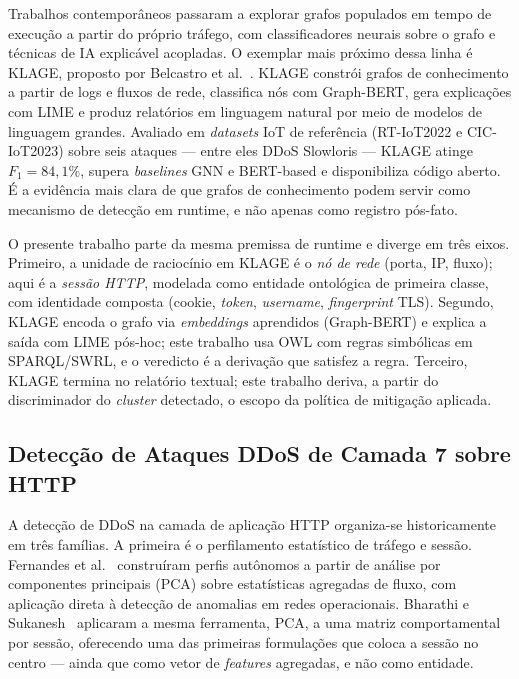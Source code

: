 \documentclass[preprint,12pt]{elsarticle}
\begin{document}
Trabalhos contemporâneos passaram a explorar grafos populados em tempo de execução a partir do próprio tráfego, com classificadores neurais sobre o grafo e técnicas de IA explicável acopladas. O exemplar mais próximo dessa linha é KLAGE, proposto por Belcastro et al.~\cite{belcastro2025klage}. KLAGE constrói grafos de conhecimento a partir de logs e fluxos de rede, classifica nós com Graph-BERT, gera explicações com LIME e produz relatórios em linguagem natural por meio de modelos de linguagem grandes. Avaliado em \emph{datasets} IoT de referência (RT-IoT2022 e CIC-IoT2023) sobre seis ataques --- entre eles DDoS Slowloris --- KLAGE atinge $F_1 = 84{,}1\%$, supera \emph{baselines} GNN e BERT-based e disponibiliza código aberto. É a evidência mais clara de que grafos de conhecimento podem servir como mecanismo de detecção em runtime, e não apenas como registro pós-fato.

O presente trabalho parte da mesma premissa de runtime e diverge em três eixos. Primeiro, a unidade de raciocínio em KLAGE é o \emph{nó de rede} (porta, IP, fluxo); aqui é a \emph{sessão HTTP}, modelada como entidade ontológica de primeira classe, com identidade composta (cookie, \emph{token}, \emph{username}, \emph{fingerprint} TLS). Segundo, KLAGE encoda o grafo via \emph{embeddings} aprendidos (Graph-BERT) e explica a saída com LIME pós-hoc; este trabalho usa OWL com regras simbólicas em SPARQL/SWRL, e o veredicto é a derivação que satisfez a regra. Terceiro, KLAGE termina no relatório textual; este trabalho deriva, a partir do discriminador do \emph{cluster} detectado, o escopo da política de mitigação aplicada.

\subsection{Detecção de Ataques DDoS de Camada 7 sobre HTTP}
\label{sec:related:l7}

A detecção de DDoS na camada de aplicação HTTP organiza-se historicamente em três famílias. A primeira é o perfilamento estatístico de tráfego e sessão. Fernandes et al.~\cite{fernandes2015autonomous} construíram perfis autônomos a partir de análise por componentes principais (PCA) sobre estatísticas agregadas de fluxo, com aplicação direta à detecção de anomalias em redes operacionais. Bharathi e Sukanesh~\cite{bharathi2012pca} aplicaram a mesma ferramenta, PCA, a uma matriz comportamental por sessão, oferecendo uma das primeiras formulações que coloca a sessão no centro --- ainda que como vetor de \emph{features} agregadas, e não como entidade.
\end{document}
